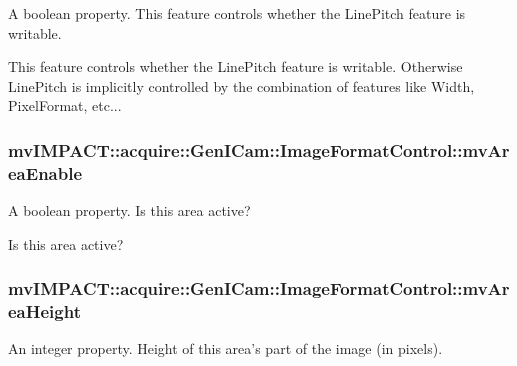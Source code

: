 A boolean property. This feature controls whether the Line\+Pitch feature is writable. 

This feature controls whether the Line\+Pitch feature is writable. Otherwise Line\+Pitch is implicitly controlled by the combination of features like Width, Pixel\+Format, etc... \hypertarget{classmv_i_m_p_a_c_t_1_1acquire_1_1_gen_i_cam_1_1_image_format_control_a67272b208d0d914f46877d65a66c95f3}{
\subsubsection[{mv\+Area\+Enable}]{ mv\+I\+M\+P\+A\+C\+T\+::acquire\+::\+Gen\+I\+Cam\+::\+Image\+Format\+Control\+::mv\+Area\+Enable}}\label{classmv_i_m_p_a_c_t_1_1acquire_1_1_gen_i_cam_1_1_image_format_control_a67272b208d0d914f46877d65a66c95f3}


A boolean property. Is this area active? 

Is this area active? \hypertarget{classmv_i_m_p_a_c_t_1_1acquire_1_1_gen_i_cam_1_1_image_format_control_af3bc8fc4c97d3c668a504fec6b990b1b}{
\subsubsection[{mv\+Area\+Height}]{ mv\+I\+M\+P\+A\+C\+T\+::acquire\+::\+Gen\+I\+Cam\+::\+Image\+Format\+Control\+::mv\+Area\+Height}}\label{classmv_i_m_p_a_c_t_1_1acquire_1_1_gen_i_cam_1_1_image_format_control_af3bc8fc4c97d3c668a504fec6b990b1b}


An integer property. Height of this area's part of the image (in pixels). 

